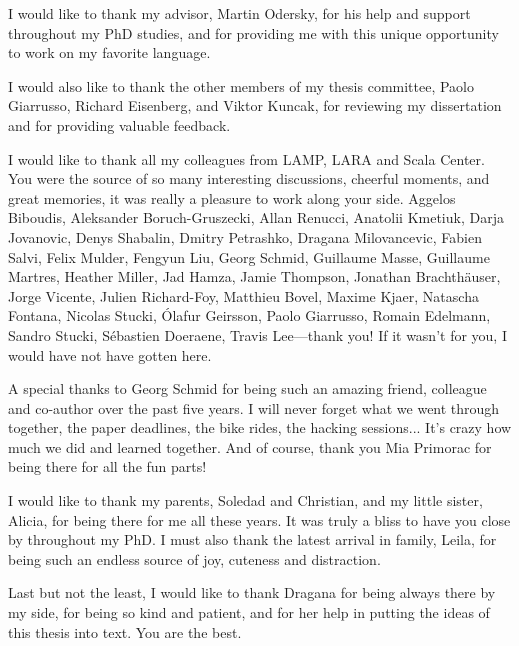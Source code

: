 I would like to thank my advisor, Martin Odersky, for his help and support throughout my PhD studies, and for providing me with this unique opportunity to work on my favorite language.

\begin{diff}
I would also like to thank the other members of my thesis committee, Paolo Giarrusso, Richard Eisenberg, and Viktor Kuncak, for reviewing my dissertation and for providing valuable feedback.
\end{diff}

I would like to thank all my colleagues from LAMP, LARA and Scala Center.
You were the source of so many interesting discussions, cheerful moments, and great memories, it was really a pleasure to work along your side.
Aggelos Biboudis,
Aleksander Boruch-Gruszecki,
Allan Renucci,
Anatolii Kmetiuk,
Darja Jovanovic,
Denys Shabalin,
Dmitry Petrashko,
Dragana Milovancevic,
Fabien Salvi,
Felix Mulder,
Fengyun Liu,
Georg Schmid,
Guillaume Masse,
Guillaume Martres,
Heather Miller,
Jad Hamza,
Jamie Thompson,
Jonathan Brachthäuser,
Jorge Vicente,
Julien Richard-Foy,
Matthieu Bovel,
Maxime Kjaer,
Natascha Fontana,
Nicolas Stucki,
Ólafur Geirsson,
Paolo Giarrusso,
Romain Edelmann,
Sandro Stucki,
Sébastien Doeraene,
Travis Lee---thank you!
If it wasn't for you, I would have not have gotten here.

A special thanks to Georg Schmid for being such an amazing friend, colleague and co-author over the past five years.
I will never forget what we went through together, the paper deadlines, the bike rides, the hacking sessions...
It's crazy how much we did and learned together.
And of course, thank you Mia Primorac for being there for all the fun parts!

I would like to thank my parents, Soledad and Christian, and my little sister, Alicia, for being there for me all these years.
It was truly a bliss to have you close by throughout my PhD.
I must also thank the latest arrival in family, Leila, for being such an endless source of joy, cuteness and distraction.

Last but not the least, I would like to thank Dragana for being always there by my side, for being so kind and patient, and for her help in putting the ideas of this thesis into text.
You are the best.
